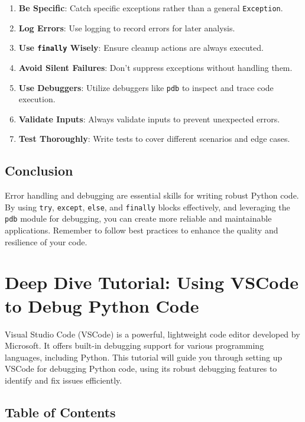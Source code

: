 \documentclass[
  letterpaper,
  DIV=11,
  numbers=noendperiod]{scrreprt}
\providecommand{\tightlist}{%
  \setlength{\itemsep}{0pt}\setlength{\parskip}{0pt}}\usepackage{longtable,booktabs,array}
\begin{document}
\begin{enumerate}
\def\labelenumi{\arabic{enumi}.}
\tightlist
\item
  \textbf{Be Specific}: Catch specific exceptions rather than a general
  \texttt{Exception}.
\item
  \textbf{Log Errors}: Use logging to record errors for later analysis.
\item
  \textbf{Use \texttt{finally} Wisely}: Ensure cleanup actions are
  always executed.
\item
  \textbf{Avoid Silent Failures}: Don't suppress exceptions without
  handling them.
\item
  \textbf{Use Debuggers}: Utilize debuggers like \texttt{pdb} to inspect
  and trace code execution.
\item
  \textbf{Validate Inputs}: Always validate inputs to prevent unexpected
  errors.
\item
  \textbf{Test Thoroughly}: Write tests to cover different scenarios and
  edge cases.
\end{enumerate}

\section{Conclusion}\label{conclusion-11}

Error handling and debugging are essential skills for writing robust
Python code. By using \texttt{try}, \texttt{except}, \texttt{else}, and
\texttt{finally} blocks effectively, and leveraging the \texttt{pdb}
module for debugging, you can create more reliable and maintainable
applications. Remember to follow best practices to enhance the quality
and resilience of your code.


\chapter{Deep Dive Tutorial: Using VSCode to Debug Python
Code}\label{deep-dive-tutorial-using-vscode-to-debug-python-code}

Visual Studio Code (VSCode) is a powerful, lightweight code editor
developed by Microsoft. It offers built-in debugging support for various
programming languages, including Python. This tutorial will guide you
through setting up VSCode for debugging Python code, using its robust
debugging features to identify and fix issues efficiently.

\section{Table of Contents}\label{table-of-contents-6}
\end{document}

